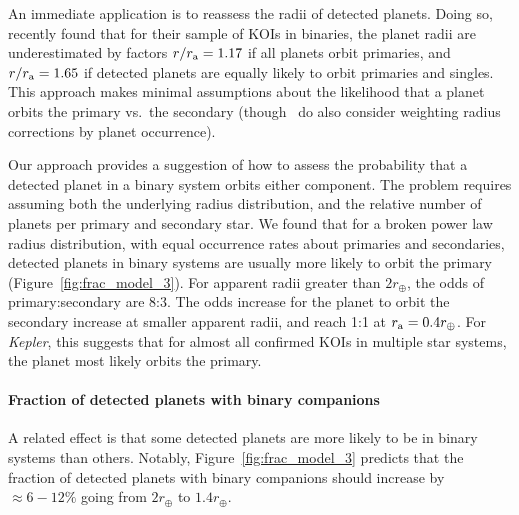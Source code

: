 \documentclass[12pt,modern]{aastex61}
\renewcommand{\a}{_{\rm a}}
\begin{document}
An immediate application is to reassess the radii of detected planets.
Doing so, \citet{hirsch_assessing_2017} recently found that for their
sample of KOIs in binaries, the planet radii are underestimated by
factors $r/r\a = 1.17$ if all planets orbit primaries, and $r/r\a =
1.65$ if detected planets are equally likely to orbit primaries and
singles.  This approach makes minimal assumptions about the likelihood
that a planet orbits the primary vs.~the secondary
(though~\citealt{hirsch_assessing_2017} do also consider weighting
radius corrections by planet occurrence).

Our approach provides a suggestion of how to assess the probability
that a detected planet in a binary system orbits either component.
The problem requires assuming both the underlying radius distribution,
and the relative number of planets per primary and secondary star.  We
found that for a broken power law radius distribution, with equal
occurrence rates about primaries and secondaries, detected planets in
binary systems are usually more likely to orbit the primary
(Figure~\ref{fig:frac_model_3}).  For apparent radii greater than
$2r_\oplus$, the odds of primary:secondary are 8:3.  The odds increase
for the planet to orbit the secondary increase at smaller apparent
radii, and reach 1:1 at $r\a=0.4r_\oplus$.  For {\it Kepler}, this
suggests that for almost all confirmed KOIs in multiple star systems,
the planet most likely orbits the primary.


\paragraph{Fraction of detected planets with binary companions}
A related effect is that some detected planets are more likely to be
in binary systems than others.  Notably,
Figure~\ref{fig:frac_model_3} predicts that the fraction of detected
planets with binary companions should increase by $\approx 6-12\%$
going from $2r_\oplus$ to $1.4r_\oplus$.
\end{document}
